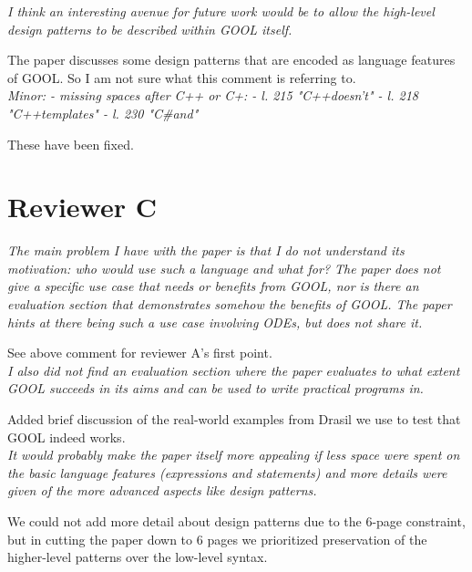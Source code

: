 \documentclass[12pt]{article}
\begin{document}
\noindent \textit{I think an interesting avenue for future work would be to 
allow the 
high-level design patterns to be described within GOOL itself.}

The paper discusses some design patterns that are encoded as language features 
of GOOL. So I am not sure what this comment is referring to. \\

\noindent \textit{Minor:
	- missing spaces after C++ or C+:
	- l. 215 "C++doesn’t"
	- l. 218 "C++templates"
	- l. 230 "C\#and"}

These have been fixed.

\section{Reviewer C}

\textit{The main problem I have with the paper is that I do not understand its 
motivation: who
would use such a language and what for? The paper does not give a specific use 
case
that needs or benefits from GOOL, nor is there an evaluation section that 
demonstrates
somehow the benefits of GOOL. The paper hints at there being such a use case 
involving
ODEs, but does not share it.}

See above comment for reviewer A's first point. \\

\noindent \textit{I also did not find an evaluation section where the paper 
evaluates to 
what extent
	GOOL succeeds in its aims and can be used to write practical programs in.}

Added brief discussion of the real-world examples from Drasil we use 
to test that GOOL indeed works. \\

\noindent \textit{It would probably make the paper itself more appealing if 
less space 
were spent on the basic
	language features (expressions and statements) and more details were given 
	of the more advanced aspects like design patterns.}

We could not add more detail about design patterns due to the 6-page 
constraint, but in cutting the paper down to 6 pages we prioritized 
preservation of the higher-level patterns over the low-level syntax.
\end{document}
